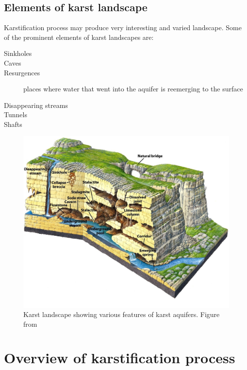 \subsection{Elements of karst landscape}

Karstification process may produce very interesting and varied landscape. Some
of the prominent elements of karst landscapes are:

\begin{description}
  \item[Sinkholes]
  \item[Caves]
  \item[Resurgences] places where water that went into the aquifer is 
    reemerging to the surface
  \item[Disappearing streams]
  \item[Tunnels]
  \item[Shafts]
\end{description}

\begin{figure}
  \centerline{\includegraphics[width=1.2\textwidth]{chapters/karstification/karst_landscape.jpg}}
  \caption{Karst landscape showing various features of karst aquifers.
    Figure from \cite{marshak2006}}
  \label{fig:karstlandscape}
\end{figure}


\section{Overview of karstification process}


